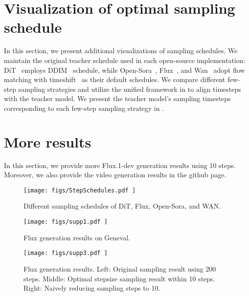 \documentclass[10pt,twocolumn,letterpaper]{article}
\begin{document}
\section{Visualization of optimal sampling schedule}\label{sec:oss}
In this section, we present additional visualizations of sampling schedules. We maintain the original teacher schedule used in each open-source implementation: DiT~\cite{dit} employs DDIM~\cite{ddim} schedule, while Open-Sora~\cite{opensora}, Flux~\cite{flux}, and Wan~\cite{wan2025} adopt flow matching with timeshift~\cite{sd3} as their default schedules. We compare different few-step sampling strategies and utilize the unified framework in  to align timesteps with the teacher model. We present the teacher model's sampling timesteps corresponding to each few-step sampling strategy in .


    \section{More results} \label{sec:result}
    In this section, we provide more Flux.1-dev \cite{flux} generation results using 10 steps. Moreover, we also provide the video generation results in the github page.

    \begin{figure}[t]
        \centering
        
        \texttt{[image: 
            figs/StepSchedules.pdf
        ]}
        \caption{Different sampling schedules of DiT, Flux, Open-Sora, and WAN.} 
        \label{fig:stepschedule}
    \end{figure}


    
    \begin{figure*}[t]
        \centering
        
        \texttt{[image: 
            figs/supp1.pdf
        ]}
        \caption{Flux generation results on Geneval.} 
 
    \end{figure*}



            \begin{figure*}[t]
        \centering

        \texttt{[image: 
            figs/supp3.pdf
        ]}
        \caption{Flux generation results. Left: Original sampling result using 200 steps. Middle: Optimal stepsize sampling result within 10 steps. Right: Naively reducing sampling steps to 10.} 
 
    \end{figure*}
\end{document}
